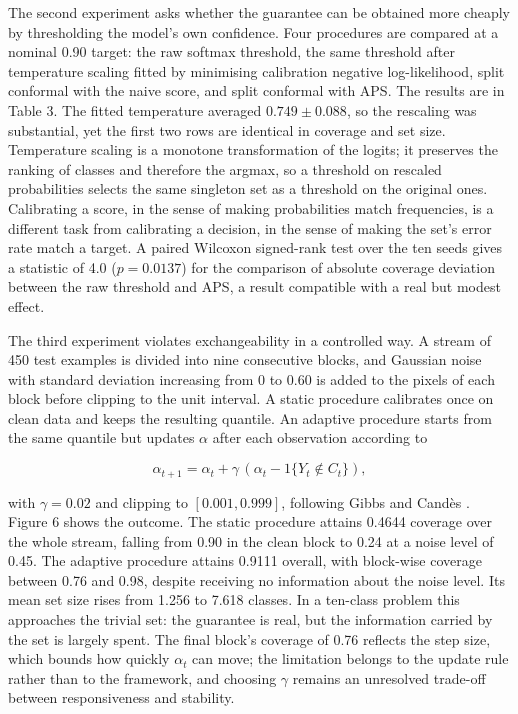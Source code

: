 The second experiment asks whether the guarantee can be obtained more cheaply by
thresholding the model's own confidence. Four procedures are compared at a nominal
0.90 target: the raw softmax threshold, the same threshold after temperature
scaling fitted by minimising calibration negative log-likelihood, split conformal
with the naive score, and split conformal with APS. The results are in Table 3. The
fitted temperature averaged $0.749\pm0.088$, so the rescaling was substantial, yet
the first two rows are identical in coverage and set size. Temperature scaling is
a monotone transformation of the logits; it preserves the ranking of classes and
therefore the argmax, so a threshold on rescaled probabilities selects the same
singleton set as a threshold on the original ones. Calibrating a score, in the
sense of making probabilities match frequencies, is a different task from
calibrating a decision, in the sense of making the set's error rate match a
target. A paired Wilcoxon signed-rank test over the ten seeds gives a statistic of
4.0 ($p=0.0137$) for the comparison of absolute coverage deviation between the
raw threshold and APS, a result compatible with a real but modest effect.

The third experiment violates exchangeability in a controlled way. A stream of 450
test examples is divided into nine consecutive blocks, and Gaussian noise with
standard deviation increasing from 0 to 0.60 is added to the pixels of each block
before clipping to the unit interval. A static procedure calibrates once on clean
data and keeps the resulting quantile. An adaptive procedure starts from the same
quantile but updates $\alpha$ after each observation according to

\begin{equation}
\alpha_{t+1} = \alpha_t + \gamma\,(\alpha_t - 1\{Y_t \notin C_t\}),
\end{equation}

with $\gamma=0.02$ and clipping to $[0.001,0.999]$, following Gibbs and Candès
\cite{Gibbs2021ACI}. Figure 6 shows the outcome. The static procedure attains 0.4644
coverage over the whole stream, falling from 0.90 in the clean block to 0.24 at a
noise level of 0.45. The adaptive procedure attains 0.9111 overall, with
block-wise coverage between 0.76 and 0.98, despite receiving no information about
the noise level. Its mean set size rises from 1.256 to 7.618 classes. In a
ten-class problem this approaches the trivial set: the guarantee is real, but the
information carried by the set is largely spent. The final block's coverage of
0.76 reflects the step size, which bounds how quickly $\alpha_t$ can move; the
limitation belongs to the update rule rather than to the framework, and choosing
$\gamma$ remains an unresolved trade-off between responsiveness and stability.

